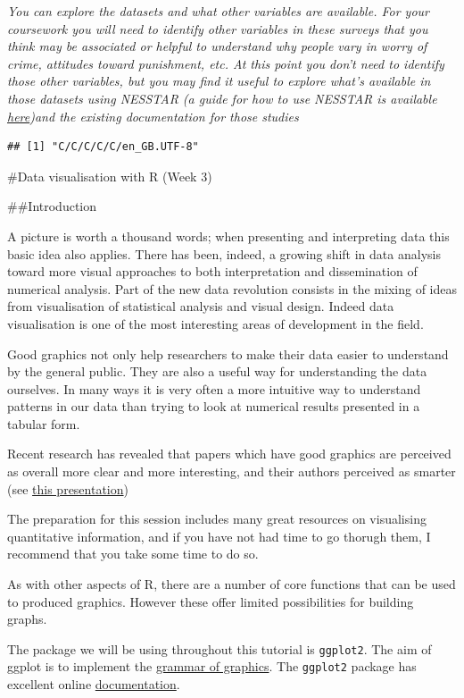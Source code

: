 \documentclass[]{book}
\theoremstyle{definition}
\theoremstyle{definition}
\theoremstyle{definition}
\theoremstyle{remark}
\begin{document}
\emph{You can explore the datasets and what other variables are
available. For your coursework you will need to identify other variables
in these surveys that you think may be associated or helpful to
understand why people vary in worry of crime, attitudes toward
punishment, etc. At this point you don't need to identify those other
variables, but you may find it useful to explore what's available in
those datasets using NESSTAR (a guide for how to use NESSTAR is
available
\href{http://nesstar.com/help/4.0/webview/getting-started/getting-to-know-nesstar-webview.html}{here})and
the existing documentation for those studies}

\begin{verbatim}
## [1] "C/C/C/C/C/en_GB.UTF-8"
\end{verbatim}

\#Data visualisation with R (Week 3)

\#\#Introduction

A picture is worth a thousand words; when presenting and interpreting
data this basic idea also applies. There has been, indeed, a growing
shift in data analysis toward more visual approaches to both
interpretation and dissemination of numerical analysis. Part of the new
data revolution consists in the mixing of ideas from visualisation of
statistical analysis and visual design. Indeed data visualisation is one
of the most interesting areas of development in the field.

Good graphics not only help researchers to make their data easier to
understand by the general public. They are also a useful way for
understanding the data ourselves. In many ways it is very often a more
intuitive way to understand patterns in our data than trying to look at
numerical results presented in a tabular form.

Recent research has revealed that papers which have good graphics are
perceived as overall more clear and more interesting, and their authors
perceived as smarter (see \href{https://vimeo.com/181771433}{this
presentation})

The preparation for this session includes many great resources on
visualising quantitative information, and if you have not had time to go
thorugh them, I recommend that you take some time to do so.

As with other aspects of R, there are a number of core functions that
can be used to produced graphics. However these offer limited
possibilities for building graphs.

The package we will be using throughout this tutorial is
\texttt{ggplot2}. The aim of ggplot is to implement the
\href{http://www.springer.com/statistics/computational+statistics/book/978-0-387-24544-7}{grammar
of graphics}. The \texttt{ggplot2} package has excellent online
\href{http://ggplot2.org/}{documentation}.
\end{document}
